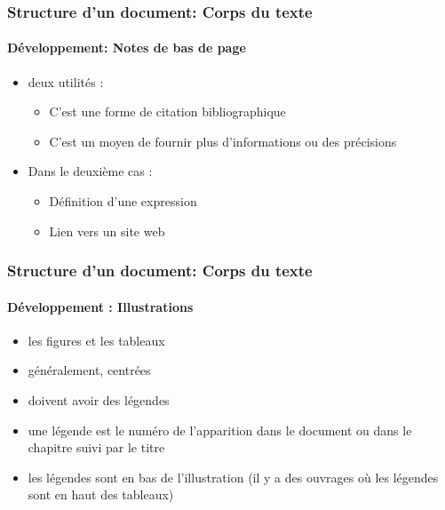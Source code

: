 \documentclass[xcolor=table]{beamer}
\begin{document}
\begin{frame}
\frametitle{Structure d'un document: Corps du texte}
\framesubtitle{Développement: Notes de bas de page}

\begin{minipage}{0.60\textwidth}
	\begin{itemize}
		\item deux utilités :
		
		\begin{itemize}
			\item C'est une forme de citation bibliographique
			\item C'est un moyen de fournir plus d'informations ou des précisions
		\end{itemize}
	
		\item Dans le deuxième cas : 
		
		\begin{itemize}
			\item Définition d'une expression
			\item Lien vers un site web
		\end{itemize}
	\end{itemize}
\end{minipage}
\begin{minipage}{0.38\textwidth}
\end{minipage}

\end{frame}

\begin{frame}
\frametitle{Structure d'un document: Corps du texte}
\framesubtitle{Développement : Illustrations}

\begin{minipage}{0.60\textwidth}
	\begin{itemize}
		\item les figures et les tableaux
		\item généralement, centrées 
		\item doivent avoir des légendes 
		\item une légende est le numéro de l'apparition dans le document ou dans le chapitre suivi par le titre
		\item les légendes sont en bas de l'illustration (il y a des ouvrages où les légendes sont en haut des tableaux)
		
	\end{itemize}
\end{minipage}
\begin{minipage}{0.38\textwidth}
\end{minipage}

\end{frame}
\end{document}

